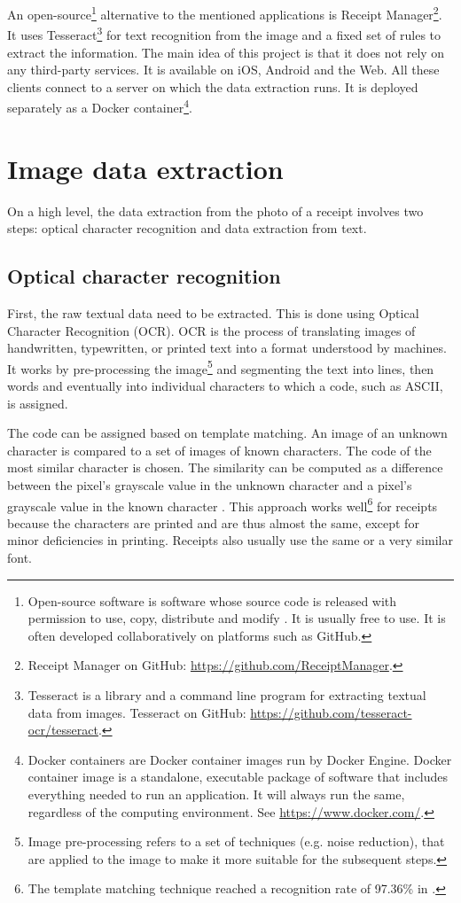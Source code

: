 \documentclass[
  printed, %
  table,   %
  oneside, %
  lof,     %
  lot,     %
]{fithesis3}
\begin{document}
An open-source\footnote{Open-source software is software whose source code is released with permission to use, copy, distribute and modify \cite{GartnerOpenSource}. It is usually free to use. It is often developed collaboratively on platforms such as GitHub.} alternative to the mentioned applications is Receipt Manager\footnote{Receipt Manager on GitHub: \url{https://github.com/ReceiptManager}.}.
It uses Tesseract\footnote{Tesseract is a library and a command line program for extracting textual data from images. Tesseract on GitHub: \url{https://github.com/tesseract-ocr/tesseract}.} for text recognition from the image and a fixed set of rules to extract the information. The main idea of this project is that it does not rely on any third-party services.
It is available on iOS, Android and the Web. All these clients connect to a server on which the data extraction runs. It is deployed separately as a Docker container\footnote{Docker containers are Docker container images run by Docker Engine. Docker container image is a standalone, executable package of software that includes everything needed to run an application. It will always run the same, regardless of the computing environment. \cite{DockerContainer} See \url{https://www.docker.com/}.}.

\chapter{Image data extraction}
On a high level, the data extraction from the photo of a receipt involves two steps: optical character recognition and data extraction from text.

\section{Optical character recognition}
First, the raw textual data need to be extracted. This is done using Optical Character Recognition (OCR). OCR is the process of translating images of handwritten, typewritten, or printed text into a format understood by machines.
It works by pre-processing the image\footnote{Image pre-processing refers to a set of techniques (e.g. noise reduction), that are applied to the image to make it more suitable for the subsequent steps.} and segmenting the text into lines, then words and eventually into individual characters to which a code, such as ASCII, is assigned. \cite{Shreya2019OCRCNN}

The code can be assigned based on template matching. An image of an unknown character is compared to a set of images of known characters. The code of the most similar character is chosen. The similarity can be computed as a difference between the pixel's grayscale value in the unknown character and a pixel's grayscale value in the known character \cite{Ziegaus2016TemplateMatching}.
This approach works well\footnote{The template matching technique reached a recognition rate of 97.36\% in \cite{Ziegaus2016TemplateMatching}.} for receipts because the characters are printed and are thus almost the same, except for minor deficiencies in printing. Receipts also usually use the same or a very similar font.
\end{document}
